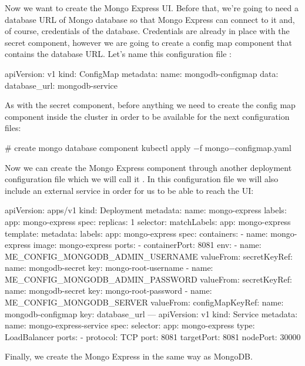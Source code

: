 Now we want to create the Mongo Express UI. Before that, we're going to need a database URL of Mongo database so that
Mongo Express can connect to it and, of course, credentials of the database. Credentials are already in place with
the secret component, however we are going to create a config map component that contains the database URL. Let's
name this configuration file :

\begin{block}
apiVersion: v1
kind: ConfigMap
metadata:
  name: mongodb-configmap
data:
  database_url: mongodb-service
\end{block}

As with the secret component, before anything we need to create the config map component inside the cluster in order
to be available for the next configuration files:

\begin{bash}
# create mongo database component
kubectl apply $-$f mongo$-$configmap.yaml
\end{bash}

Now we can create the Mongo Express component through another deployment configuration file which we will call it
. In this configuration file we will also include an external service in order for us to be
able to reach the UI:

\begin{block}
apiVersion: apps/v1
kind: Deployment
metadata:
  name: mongo-express
  labels:
    app: mongo-express
spec:
  replicas: 1
  selector:
    matchLabels:
      app: mongo-express
  template:
    metadata:
      labels:
        app: mongo-express
    spec:
      containers:
      - name: mongo-express
        image: mongo-express
        ports:
        - containerPort: 8081
        env:
        - name: ME_CONFIG_MONGODB_ADMIN_USERNAME
          valueFrom:
            secretKeyRef:
              name: mongodb-secret
              key: mongo-root-username
        - name: ME_CONFIG_MONGODB_ADMIN_PASSWORD
          valueFrom:
            secretKeyRef:
              name: mongodb-secret
              key: mongo-root-password
        - name: ME_CONFIG_MONGODB_SERVER
          valueFrom:
            configMapKeyRef:
              name: mongodb-configmap
              key: database_url
---
apiVersion: v1
kind: Service
metadata:
  name: mongo-express-service
spec:
  selector:
    app: mongo-express
  type: LoadBalancer
  ports:
    - protocol: TCP
      port: 8081
      targetPort: 8081
      nodePort: 30000
\end{block}

Finally, we create the Mongo Express in the same way as MongoDB.